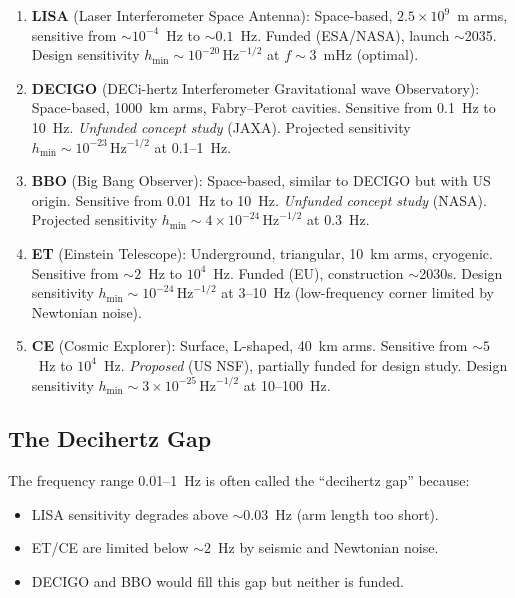 \documentclass[11pt]{article}
\theoremstyle{definition}
\theoremstyle{remark}
\newcommand{\ee}[1]{\times10^{#1}}
\newcommand{\sqrtHz}{\,\mathrm{Hz}^{-1/2}}
\begin{document}
\begin{enumerate}[nosep]
\item \textbf{LISA} (Laser Interferometer Space Antenna):
  Space-based, $2.5\ee{9}$~m arms, sensitive from $\sim 10^{-4}$~Hz to
  $\sim 0.1$~Hz. Funded (ESA/NASA), launch $\sim$2035. Design sensitivity
  $h_{\min} \sim 10^{-20}\sqrtHz$ at $f \sim 3$~mHz (optimal).

\item \textbf{DECIGO} (DECi-hertz Interferometer Gravitational wave
  Observatory): Space-based, 1000~km arms, Fabry--Perot cavities.
  Sensitive from 0.1~Hz to 10~Hz. \emph{Unfunded concept study} (JAXA).
  Projected sensitivity $h_{\min} \sim 10^{-23}\sqrtHz$ at 0.1--1~Hz.

\item \textbf{BBO} (Big Bang Observer): Space-based, similar to DECIGO but
  with US origin. Sensitive from 0.01~Hz to 10~Hz. \emph{Unfunded concept
  study} (NASA). Projected sensitivity $h_{\min} \sim 4\ee{-24}\sqrtHz$
  at 0.3~Hz.

\item \textbf{ET} (Einstein Telescope): Underground, triangular,
  10~km arms, cryogenic. Sensitive from $\sim 2$~Hz to $10^4$~Hz.
  Funded (EU), construction $\sim$2030s. Design sensitivity
  $h_{\min} \sim 10^{-24}\sqrtHz$ at 3--10~Hz (low-frequency corner
  limited by Newtonian noise).

\item \textbf{CE} (Cosmic Explorer): Surface, L-shaped, 40~km arms.
  Sensitive from $\sim 5$~Hz to $10^4$~Hz. \emph{Proposed} (US NSF),
  partially funded for design study. Design sensitivity
  $h_{\min} \sim 3\ee{-25}\sqrtHz$ at 10--100~Hz.
\end{enumerate}

\subsection{The Decihertz Gap}

The frequency range 0.01--1~Hz is often called the ``decihertz gap'' because:
\begin{itemize}[nosep]
\item LISA sensitivity degrades above $\sim 0.03$~Hz (arm length too short).
\item ET/CE are limited below $\sim 2$~Hz by seismic and Newtonian noise.
\item DECIGO and BBO would fill this gap but neither is funded.
\end{itemize}
\end{document}
